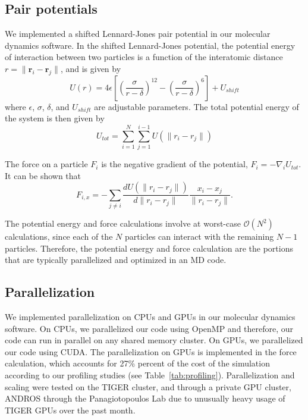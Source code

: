 \documentclass[12pt]{article}
\begin{document}
\subsection{Pair potentials} \label{subsec:potential}

We implemented a shifted Lennard-Jones pair potential in our molecular dynamics software.
%
In the shifted Lennard-Jones potential, the potential energy of interaction between two particles is a function of the interatomic distance $r = \|\mathbf{r}_i - \mathbf{r}_j \|$, and is given by
\begin{equation}
U(r) = 4 \epsilon\left[ \left( \frac{\sigma}{r-\delta} \right)^{12} - \left( \frac{\sigma}{r-\delta} \right)^6 \right] + U_{shift}
\end{equation}
where $\epsilon$, $\sigma$, $\delta$, and $U_{shift}$ are adjustable parameters.
%
The total potential energy of the system is then given by
\begin{equation}
U_{tot} = \sum_{i=1}^{N} \sum_{j=1}^{i-1} U\left( \| r_i - r_j \| \right)
\end{equation}

The force on a particle $F_i$ is the negative gradient of the potential, $F_i = -\nabla_i U_{tot}$.
%
It can be shown that
\begin{equation}
F_{i, x} = -\sum_{j \ne i} \frac{d U\left( \| r_i - r_j \| \right)}{d \| r_i - r_j \| } \frac{x_i - x_j}{\|r_i - r_j\|}.
\end{equation}

The potential energy and force calculations involve at worst-case $\mathcal{O}(N^2)$ calculations, since each of the $N$ particles can interact with the remaining $N-1$ particles.
%
Therefore, the potential energy and force calculation are the portions that are typically parallelized and optimized in an MD code.

\subsection{Parallelization}

We implemented parallelization on CPUs and GPUs in our molecular dynamics software.
%
On CPUs, we parallelized our code using OpenMP and therefore, our code can run in parallel on any shared memory cluster.
%
On GPUs, we parallelized our code using CUDA.
The parallelization on GPUs is implemented in the force calculation, which accounts for 27\% percent of the cost of the simulation according to our profiling studies (see Table~\ref{tab:profiling}).
%
Parallelization and scaling were tested on the TIGER cluster, and through a private GPU cluster, ANDROS through the Panagiotopoulos Lab due to unusually heavy usage of TIGER GPUs over the past month.
\end{document}
